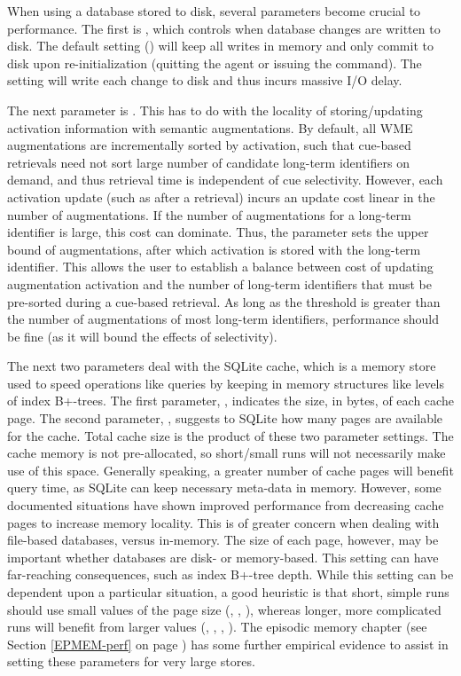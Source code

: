 When using a database stored to disk, several parameters become crucial to performance.  
The first is , which controls when database changes are written to disk.   
The default setting () will keep all writes in memory and only commit to disk upon re-initialization (quitting the agent or issuing the  command).  
The  setting will write each change to disk and thus incurs massive I/O delay.

The next parameter is . 
This has to do with the locality of storing/updating activation information with semantic augmentations. 
By default, all WME augmentations are incrementally sorted by activation, such that cue-based retrievals need not sort large number of candidate long-term identifiers on demand, and thus retrieval time is independent of cue selectivity. 
However, each activation update (such as after a retrieval) incurs an update cost linear in the number of augmentations. 
If the number of augmentations for a long-term identifier is large, this cost can dominate. 
Thus, the  parameter sets the upper bound of augmentations, after which activation is stored with the long-term identifier. 
This allows the user to establish a balance between cost of updating augmentation activation and the number of long-term identifiers that must be pre-sorted during a cue-based retrieval. 
As long as the threshold is greater than the number of augmentations of most long-term identifiers, performance should be fine (as it will bound the effects of selectivity).

The next two parameters deal with the SQLite cache, which is a memory store used to speed operations like queries by keeping in memory structures like levels of index B+-trees. 
The first parameter, , indicates the size, in bytes, of each cache page. 
The second parameter, , suggests to SQLite how many pages are available for the cache. 
Total cache size is the product of these two parameter settings. 
The cache memory is not pre-allocated, so short/small runs will not necessarily make use of this space. 
Generally speaking, a greater number of cache pages will benefit query time, as SQLite can keep necessary meta-data in memory. 
However, some documented situations have shown improved performance from decreasing cache pages to increase memory locality. 
This is of greater concern when dealing with file-based databases, versus in-memory. 
The size of each page, however, may be important whether databases are disk- or memory-based. 
This setting can have far-reaching consequences, such as index B+-tree depth. 
While this setting can be dependent upon a particular situation, a good heuristic is that short, simple runs should use small values of the page size (, , ), whereas longer, more complicated runs will benefit from larger values (, , , ). 
The episodic memory chapter (see Section \ref{EPMEM-perf} on page \pageref{EPMEM-perf}) has some further empirical evidence to assist in setting these parameters for very large stores.

